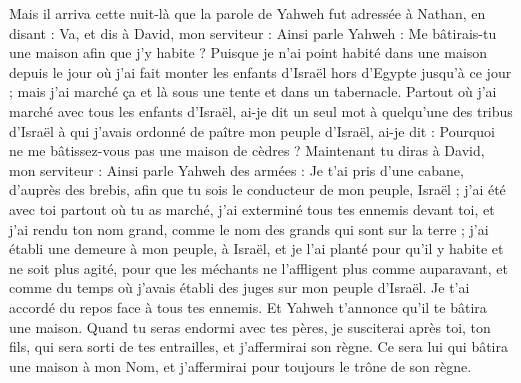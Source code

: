 \begin{multicols}{2}
Mais il arriva cette nuit-là que la parole de Yahweh fut adressée à Nathan, en disant :
Va, et dis à David, mon serviteur : Ainsi parle Yahweh : Me bâtirais-tu une maison afin que j'y habite ?
Puisque je n'ai point habité dans une maison depuis le jour où j'ai fait monter les enfants d'Israël hors d'Egypte jusqu'à ce jour ; mais j'ai marché ça et là sous une tente et dans un tabernacle.
Partout où j'ai marché avec tous les enfants d'Israël, ai-je dit un seul mot à quelqu'une des tribus d'Israël à qui j'avais ordonné de paître mon peuple d'Israël, ai-je dit : Pourquoi ne me bâtissez-vous pas une maison de cèdres ?
Maintenant tu diras à David, mon serviteur : Ainsi parle Yahweh des armées : Je t'ai pris d'une cabane, d'auprès des brebis, afin que tu sois le conducteur de mon peuple, Israël ;
j'ai été avec toi partout où tu as marché, j'ai exterminé tous tes ennemis devant toi, et j'ai rendu ton nom grand, comme le nom des grands qui sont sur la terre ;
j'ai établi une demeure à mon peuple, à Israël, et je l'ai planté pour qu'il y habite et ne soit plus agité, pour que les méchants ne l'affligent plus comme auparavant,
et comme du temps où j'avais établi des juges sur mon peuple d'Israël. Je t'ai accordé du repos face à tous tes ennemis. Et Yahweh t'annonce qu'il te bâtira une maison.
Quand tu seras endormi avec tes pères, je susciterai après toi, ton fils, qui sera sorti de tes entrailles, et j'affermirai son règne.
Ce sera lui qui bâtira une maison à mon Nom, et j'affermirai pour toujours le trône de son règne.

\end{multicols}

